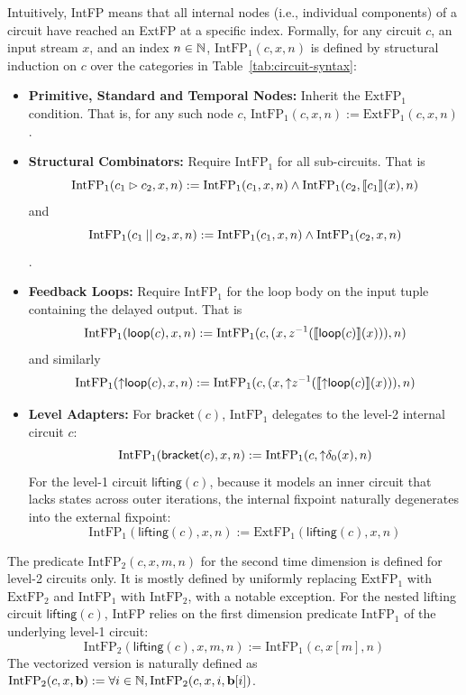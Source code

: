 \begin{definition}\label{De:IntFP}
    Intuitively, IntFP means that all internal nodes (i.e., individual components) of a circuit have reached an ExtFP at a specific index.
    Formally, for any circuit $c$, an input stream $x$, and an index $n \in \mathbb{N}$, $\text{IntFP}_1(c, x, n)$ is defined by structural induction on $c$ over the categories in Table~\ref{tab:circuit-syntax}:
    \begin{itemize}
        \item \textbf{Primitive, Standard and Temporal Nodes:} Inherit the $\text{ExtFP}_1$ condition. That is, for any such node $c$, $\text{IntFP}_1(c, x, n) := \text{ExtFP}_1(c, x, n)$.
        \item \textbf{Structural Combinators:} Require $\text{IntFP}_1$ for all sub-circuits. That is
        \[\text{IntFP}_1(c_1 \mathbin{\vartriangleright} c_2, x, n) := \text{IntFP}_1(c_1, x, n) \land \text{IntFP}_1(c_2, \llbracket c_1 \rrbracket(x), n)\] 
        and 
        \[\text{IntFP}_1(c_1 \mathbin{||} c_2, x, n) := \text{IntFP}_1(c_1, x, n) \land \text{IntFP}_1(c_2, x, n)\].
        \item \textbf{Feedback Loops:} Require $\text{IntFP}_1$ for the loop body on the input tuple containing the delayed output. That is
        \[\text{IntFP}_1(\mathsf{loop}(c), x, n) := \text{IntFP}_1(c, (x, z^{-1}(\llbracket \mathsf{loop}(c) \rrbracket(x))), n)\] 
        and similarly 
        \[\text{IntFP}_1(\mathsf{{\uparrow}loop}(c), x, n) := \text{IntFP}_1(c, (x, {\uparrow}z^{-1}(\llbracket \mathsf{{\uparrow}loop}(c) \rrbracket(x))), n)\]
        \item \textbf{Level Adapters:} For $\mathsf{bracket}(c)$, $\text{IntFP}_1$ delegates to the level-2 internal circuit $c$: \[\text{IntFP}_1(\mathsf{bracket}(c), x, n) := \text{IntFP}_1(c, {\uparrow}\delta_0(x), n)\]
        For the level-1 circuit $\mathsf{lifting}(c)$, because it models an inner circuit that lacks states across outer iterations, the internal fixpoint naturally degenerates into the external fixpoint: 
        \[\text{IntFP}_1(\mathsf{lifting}(c), x, n) := \text{ExtFP}_1(\mathsf{lifting}(c), x, n)\]
    \end{itemize}
    The predicate $\text{IntFP}_2(c, x, m, n)$ for the second time dimension is defined for level-2 circuits only. It is mostly defined by uniformly replacing $\text{ExtFP}_1$ with $\text{ExtFP}_2$ and $\text{IntFP}_1$ with $\text{IntFP}_2$, with a notable exception. For the nested lifting circuit $\mathsf{lifting}(c)$, IntFP relies on the first dimension predicate $\text{IntFP}_1$ of the underlying level-1 circuit: 
    \[\text{IntFP}_2(\mathsf{lifting}(c), x, m, n) := \text{IntFP}_1(c, x[m], n)\]
    The vectorized version is naturally defined as $\text{IntFP}_2(c, x, \mathbf{b}) := \forall i \in \mathbb{N}, \text{IntFP}_2(c, x, i, \mathbf{b}[i])$.
\end{definition}


